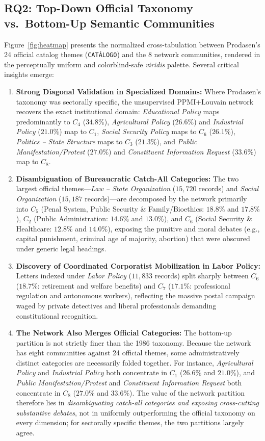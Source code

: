 \documentclass[pdflatex,sn-basic]{sn-jnl}
\begin{document}
\subsection{RQ2: Top-Down Official Taxonomy vs.\ Bottom-Up Semantic Communities}
Figure~\ref{fig:heatmap} presents the normalized cross-tabulation between Prodasen's 24 official catalog themes (\texttt{CAT\'{A}LOGO}) and the 8 network communities, rendered in the perceptually uniform and colorblind-safe \textit{viridis} palette. Several critical insights emerge:
\begin{enumerate}
    \item \textbf{Strong Diagonal Validation in Specialized Domains:} Where Prodasen's taxonomy was sectorally specific, the unsupervised PPMI+Louvain network recovers the exact institutional domain: \textit{Educational Policy} maps predominantly to $C_4$ ($34.8\%$), \textit{Agricultural Policy} ($26.6\%$) and \textit{Industrial Policy} ($21.0\%$) map to $C_1$, \textit{Social Security Policy} maps to $C_6$ ($26.1\%$), \textit{Politics -- State Structure} maps to $C_3$ ($21.3\%$), and \textit{Public Manifestation/Protest} ($27.0\%$) and \textit{Constituent Information Request} ($33.6\%$) map to $C_8$.
    \item \textbf{Disambiguation of Bureaucratic Catch-All Categories:} The two largest official themes---\textit{Law -- State Organization} ($15,720$ records) and \textit{Social Organization} ($15,187$ records)---are decomposed by the network primarily into $C_5$ (Penal System, Public Security \& Family/Bioethics: $18.8\%$ and $17.8\%$), $C_2$ (Public Administration: $14.6\%$ and $13.0\%$), and $C_6$ (Social Security \& Healthcare: $12.8\%$ and $14.0\%$), exposing the punitive and moral debates (e.g., capital punishment, criminal age of majority, abortion) that were obscured under generic legal headings.
    \item \textbf{Discovery of Coordinated Corporatist Mobilization in Labor Policy:} Letters indexed under \textit{Labor Policy} ($11,833$ records) split sharply between $C_6$ ($18.7\%$: retirement and welfare benefits) and $C_7$ ($17.1\%$: professional regulation and autonomous workers), reflecting the massive postal campaign waged by private detectives and liberal professionals demanding constitutional recognition.
    \item \textbf{The Network Also Merges Official Categories:} The bottom-up partition is not strictly finer than the 1986 taxonomy. Because the network has eight communities against 24 official themes, some administratively distinct categories are necessarily folded together. For instance, \textit{Agricultural Policy} and \textit{Industrial Policy} both concentrate in $C_1$ ($26.6\%$ and $21.0\%$), and \textit{Public Manifestation/Protest} and \textit{Constituent Information Request} both concentrate in $C_8$ ($27.0\%$ and $33.6\%$). The value of the network partition therefore lies in \emph{disambiguating catch-all categories and exposing cross-cutting substantive debates}, not in uniformly outperforming the official taxonomy on every dimension; for sectorally specific themes, the two partitions largely agree.
\end{enumerate}
\end{document}
